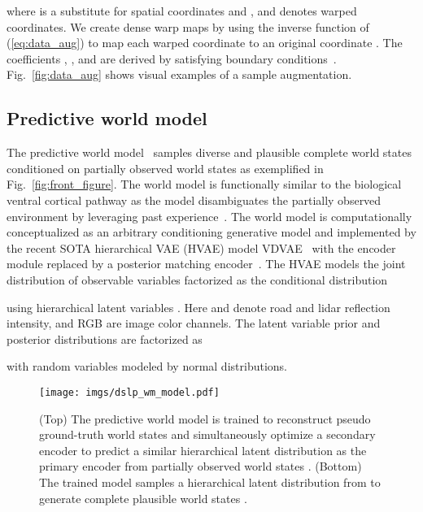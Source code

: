 \documentclass[letterpaper, 10 pt, conference]{ieeeconf}
\begin{document}
\noindent where  is a substitute for spatial coordinates  and , and  denotes warped coordinates. We create dense warp maps by using the inverse function of (\ref{eq:data_aug}) to map each warped coordinate  to an original coordinate . The coefficients , , and  are derived by satisfying boundary conditions~\cite{karlsson2020dsla}. Fig.~\ref{fig:data_aug} shows visual examples of a sample augmentation.

\subsection{Predictive world model}
The predictive world model~\cite{karlsson2023pred_wm} samples diverse and plausible complete world states  conditioned on partially observed world states  as exemplified in Fig.~\ref{fig:front_figure}. The world model is functionally similar to the biological ventral cortical pathway as the model disambiguates the partially observed environment by leveraging past experience~\cite{milner2008visual_systems}.
The world model is computationally conceptualized as an arbitrary conditioning generative model and implemented by the recent SOTA hierarchical VAE (HVAE) model VDVAE~\cite{child2021vdvae} with the encoder module replaced by a posterior matching encoder~\cite{karlsson2023pred_wm}. The HVAE models the joint distribution of observable variables  factorized as the conditional distribution

\noindent using hierarchical latent variables . Here  and  denote road and lidar reflection intensity, and RGB are image color channels. The latent variable prior  and posterior  distributions are factorized as

\noindent with random variables  modeled by normal distributions. 

\begin{figure}\centering
\texttt{[image: imgs/dslp\_wm\_model.pdf]}
\vspace{-3mm}
\caption{(Top) The predictive world model is trained to reconstruct pseudo ground-truth world states  and simultaneously optimize a secondary encoder  to predict a similar hierarchical latent distribution  as the primary encoder  from partially observed world states . (Bottom) The trained model samples a hierarchical latent distribution  from  to generate complete plausible world states .}
\label{fig:pred_wm}
\vspace{-5mm}
\end{figure}
\end{document}
